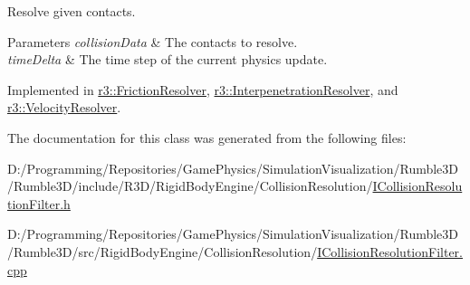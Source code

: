 Resolve given contacts. 


\begin{DoxyParams}{Parameters}
{\em collision\+Data} & The contacts to resolve. \\
\hline
{\em time\+Delta} & The time step of the current physics update. \\
\hline
\end{DoxyParams}


Implemented in \mbox{\hyperlink{classr3_1_1_friction_resolver_af26a84959e95749088f713176ec3c096}{r3\+::\+Friction\+Resolver}}, \mbox{\hyperlink{classr3_1_1_interpenetration_resolver_a7c896a7e8e0321c9f26b3d9c616d16ee}{r3\+::\+Interpenetration\+Resolver}}, and \mbox{\hyperlink{classr3_1_1_velocity_resolver_a93e8859d1ab3407b073328a58b7caeef}{r3\+::\+Velocity\+Resolver}}.



The documentation for this class was generated from the following files\+:\begin{DoxyCompactItemize}
\item 
D\+:/\+Programming/\+Repositories/\+Game\+Physics/\+Simulation\+Visualization/\+Rumble3\+D/\+Rumble3\+D/include/\+R3\+D/\+Rigid\+Body\+Engine/\+Collision\+Resolution/\mbox{\hyperlink{_i_collision_resolution_filter_8h}{I\+Collision\+Resolution\+Filter.\+h}}\item 
D\+:/\+Programming/\+Repositories/\+Game\+Physics/\+Simulation\+Visualization/\+Rumble3\+D/\+Rumble3\+D/src/\+Rigid\+Body\+Engine/\+Collision\+Resolution/\mbox{\hyperlink{_i_collision_resolution_filter_8cpp}{I\+Collision\+Resolution\+Filter.\+cpp}}\end{DoxyCompactItemize}

